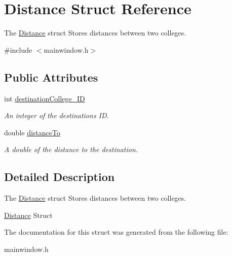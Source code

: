 \hypertarget{struct_distance}{}\section{Distance Struct Reference}
\label{struct_distance}


The \mbox{\hyperlink{struct_distance}{Distance}} struct Stores distances between two colleges.  




{\ttfamily \#include $<$mainwindow.\+h$>$}

\subsection*{Public Attributes}
\begin{DoxyCompactItemize}
\item 
\mbox{\label{struct_distance_a11eea19a1d9b2dc334ea53101994a6f0}} 
int \mbox{\hyperlink{struct_distance_a11eea19a1d9b2dc334ea53101994a6f0}{destination\+College\+\_\+\+ID}}
\begin{DoxyCompactList}\small\item\em An integer of the destination\textquotesingle{}s ID. \end{DoxyCompactList}\item 
\mbox{\label{struct_distance_a40bfd91b41ac3e5c6fd58e7c0ac4f3a6}} 
double \mbox{\hyperlink{struct_distance_a40bfd91b41ac3e5c6fd58e7c0ac4f3a6}{distance\+To}}
\begin{DoxyCompactList}\small\item\em A double of the distance to the destination. \end{DoxyCompactList}\end{DoxyCompactItemize}


\subsection{Detailed Description}
The \mbox{\hyperlink{struct_distance}{Distance}} struct Stores distances between two colleges. 

\mbox{\hyperlink{struct_distance}{Distance}} Struct 

The documentation for this struct was generated from the following file\+:\begin{DoxyCompactItemize}
\item 
mainwindow.\+h\end{DoxyCompactItemize}
